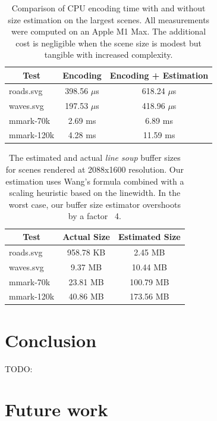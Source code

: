 \documentclass[sigconf]{acmart}
\begin{document}
\begin{table}
    \caption{Comparison of CPU encoding time with and without size estimation on the largest scenes. All measurements were computed on an Apple M1 Max. The additional cost is negligible when the scene size is modest but tangible with increased complexity.}
    \begin{tabular}{|l|c|c|}
    \hline
        \multicolumn{1}{|c|}{\textbf{Test}} & \textbf{Encoding} & \textbf{Encoding + Estimation} \\
    \hline
        roads.svg  & 398.56 $\mu$s & 618.24 $\mu$s \\
        waves.svg  & 197.53 $\mu$s & 418.96 $\mu$s \\
        mmark-70k  & 2.69 ms       & 6.89 ms       \\
        mmark-120k & 4.28 ms       & 11.59 ms      \\
    \hline
    \end{tabular}
    \label{table:bump-estimate-cost}
\end{table}

\begin{table}
    \caption{The estimated and actual \emph{line soup} buffer sizes for scenes rendered at 2088x1600 resolution. Our estimation uses Wang's formula combined with a scaling heuristic based on the linewidth. In the worst case, our buffer size estimator overshoots by a factor ~4.}
    \begin{tabular}{|l|c|c|}
    \hline
        \multicolumn{1}{|c|}{\textbf{Test}} & Actual Size & Estimated Size \\
    \hline
        roads.svg  & 958.78 KB & 2.45 MB    \\
        waves.svg  & 9.37 MB   & 10.44 MB   \\
        mmark-70k  & 23.81 MB  & 100.79 MB  \\
        mmark-120k & 40.86 MB  & 173.56 MB  \\
    \hline
    \end{tabular}
    \label{table:bump-estimate-mem}
\end{table}

\section{Conclusion}

TODO:

\section{Future work}
\end{document}
